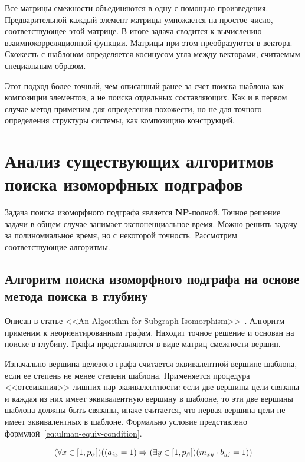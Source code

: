 Все матрицы смежности объединяются в одну с помощью произведения.
Предварительной каждый элемент матрицы умножается на простое число,
соответствующее этой матрице.
В итоге задача сводится к вычислению взаимнокорреляционной функции.
Матрицы при этом преобразуются в вектора.
Схожесть с шаблоном определяется косинусом угла между векторами,
считаемым специальным образом.

Этот подход более точный, чем описанный ранее за счет поиска шаблона как композиции
элементов, а не поиска отдельных составляющих.
Как и в первом случае метод применим для определения похожести,
но не для точного определения структуры системы, как композицию конструкций.

\section{Анализ существующих алгоритмов поиска изоморфных подграфов}

Задача поиска изоморфного подграфа является \textbf{NP}-полной.
Точное решение задачи в общем случае занимает экспоненциальное время.
Можно решить задачу за полиномиальное время, но с некоторой точность.
Рассмотрим соответствующие алгоритмы.

\subsection{Алгоритм поиска изоморфного подграфа на основе метода поиска в глубину}

Описан в статье <<An Algorithm for Subgraph Isomorphism>>~\cite{SubgraphIsomorphism}.
Алгоритм применим к неориентированным графам.
Находит точное решение и основан на поиске в глубину.
Графы представляются в виде матриц смежности вершин.

Изначально вершина целевого графа считается эквивалентной вершине шаблона, если
ее степень не менее степени шаблона.
Применяется процедура <<отсеивания>> лишних пар эквивалентности:
если две вершины цели связаны и каждая из них имеет эквивалентную вершину в шаблоне,
то эти две вершины шаблона должны быть связаны, иначе считается, что первая
вершина цели не имеет эквивалентных в шаблоне.
Формально условие представлено формулой~\ref{eq:ulman-equiv-condition}.

\begin{equation} \label{eq:ulman-equiv-condition}
(\forall x \in [1, p_\alpha]) ( (a_{ix} = 1) \Rightarrow (\exists y \in [1, p_\beta]) (m_{xy} \cdot b_{yj} = 1) )
\end{equation}

